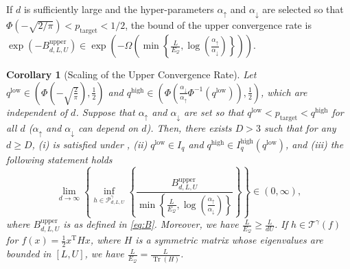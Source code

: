 \documentclass[journal]{IEEEtran}
\DeclareMathOperator{\Tr}{Tr}     %
\renewcommand{\geq}{\geqslant} %
\newtheorem{corollary}[theorem]{Corollary}
\theoremstyle{definition}
\newcommand{\aup}{\alpha_{\uparrow}}
\newcommand{\adown}{\alpha_{\downarrow}}
\begin{document}
If $d$ is sufficiently large and the hyper-parameters $\aup$ and $\adown$ are selected so that $\Phi(- \sqrt{2/\pi}) < p_\mathrm{target} < 1/2$, the bound of the upper convergence rate is $\exp(- B_{d,L,U}^\mathrm{upper}) \in \exp\left(-\Omega\left(\min\left\{ \frac{L}{E_\mathcal{Q}},  \log\left(\frac{\aup}{\adown}\right)\right\}\right)\right)$.
\begin{corollary}[Scaling of the Upper Convergence Rate]\label{cor:upper}
Let $q^\mathrm{low} \in \left(\Phi\left(-\sqrt{\frac{2}{\pi}}\right), \frac{1}{2}\right)$ and 
$q^\mathrm{high} \in \left(
\Phi\left( \frac{\adown}{\aup} \Phi^{-1}\left( q^\mathrm{low}\right)\right)
, \frac{1}{2}\right)$, which are independent of $d$. 
Suppose that $\aup$ and $\adown$ are set so that $q^\mathrm{low} < p_\mathrm{target} < q^\mathrm{high}$ for all $d$ ($\aup$ and $\adown$ can depend on $d$). 
Then, there exists $D > 3$ such that for any $d \geq D$, (i)  is satisfied under , (ii)
$q^\mathrm{low} \in I_q$ and $q^\mathrm{high} \in I_q^\mathrm{high}(q^\mathrm{low})$, and (iii) the following statement holds
\begin{equation}
\lim_{d \to \infty}
\left\{
\inf_{h \in \mathcal{P}_{d, L, U}^\gamma}
\left\{
\frac{ B_{d, L, U}^\mathrm{upper} }{ \min\left\{ \frac{L}{E_\mathcal{Q}},  \log\left(\frac{\aup}{\adown}\right)\right\} }
\right\}
\right\}
\in (0, \infty) ,
\label{eq:order_B}
\end{equation}    
where $B_{d, L, U}^\mathrm{upper}$ is as defined in \eqref{eq:B}.
Moreover, we have $\frac{L}{E_\mathcal{Q}} \geq \frac{L}{dU}$. If $h \in \mathcal{T}^\gamma(f)$ for $f(x) = \frac{1}{2} x^\mathrm{T} H x$, where $H$ is a symmetric matrix whose eigenvalues are bounded in $[L, U]$, we have $\frac{L}{E_\mathcal{Q}} = \frac{L}{\Tr(H)}$.
\end{corollary}
\end{document}

